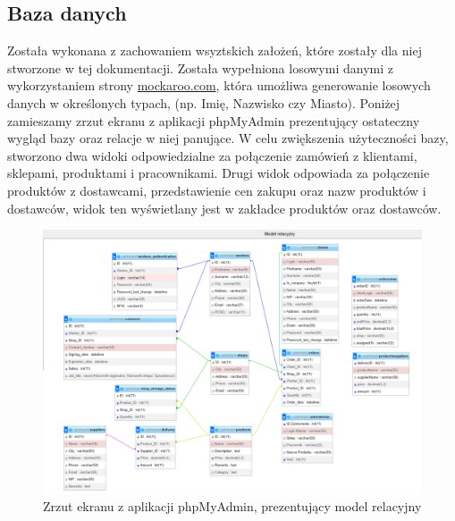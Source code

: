 \documentclass[12pt,a4paper]{article}
\begin{document}
    \subsection{Baza danych}
        Została wykonana z zachowaniem wsyztskich założeń, które zostały dla niej stworzone w tej dokumentacji. Została wypełniona losowymi danymi z wykorzystaniem strony \href{https://www.mockaroo.com/}{mockaroo.com}, która umożliwa generowanie losowych danych w określonych typach, (np. Imię, Nazwisko czy Miasto). Poniżej zamieszamy zrzut ekranu z aplikacji phpMyAdmin prezentujący ostateczny wygląd bazy oraz relacje w niej panujące. W celu zwiększenia użyteczności bazy, stworzono dwa widoki odpowiedzialne za połączenie zamówień z klientami, sklepami, produktami i pracownikami. Drugi widok odpowiada za połączenie produktów z dostawcami, przedstawienie cen zakupu oraz nazw produktów i dostawców, widok ten wyświetlany jest w zakładce produktów oraz dostawców. 
            
        \begin{figure}[H]
            \centering
            \includegraphics[scale=0.4]{images/phpmyadmin.png}
            \caption{Zrzut ekranu z aplikacji phpMyAdmin, prezentujący model relacyjny}
        \end{figure}
                 
\end{document}
